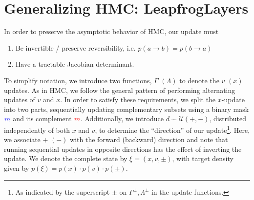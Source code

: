 \documentclass[a4paper,11pt]{article}
\newcommand{\mask}{\textcolor{blue}{{m}}}
\newcommand{\maskbar}{\textcolor{red}{\bar{m}}}
\begin{document}
\section{\label{sec:l2hmc}Generalizing HMC: LeapfrogLayers}
%
In order to preserve the asymptotic behavior of HMC, our update must
%
\begin{enumerate}
    \item Be invertible / preserve reversibility, i.e. \(p(a\rightarrow b) =
        p(b\rightarrow a)\)
    \item Have a tractable Jacobian determinant.
\end{enumerate}
%
To simplify notation, we introduce two functions, \(\Gamma\) \((\Lambda)\) to
denote the \(v\) \((x)\) updates.
%
As in HMC, we follow the general pattern of performing alternating updates of
\(v\) and \(x\).
%
In order to satisfy these requirements, we split the \(x\)-update
into two parts, sequentially updating complementary subsets using a binary mask
\(\mask\) and its complement \(\maskbar\).
%
Additionally, we introduce \(d \sim \mathcal{U} (+, -)\), distributed
independently of both \(x\) and \(v\), to determine the ``direction'' of our
update\footnote{%
  As indicated by the superscript \(\pm\) on \(\Gamma^{\pm}, \Lambda^{\pm}\) in
  the update functions.
}.
%
Here, we associate \(+\) \((-)\) with the forward (backward) direction and note
that running sequential updates in opposite directions has the effect of
inverting the update.
%
We denote the complete state by \(\xi = (x, v, \pm)\), with target density
given by \(p(\xi) = p(x)\cdot p(v)\cdot p(\pm)\).
%
\end{document}
